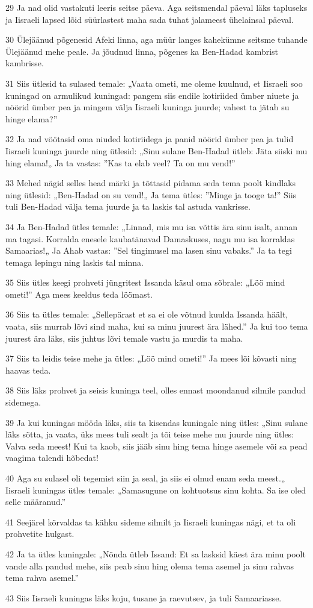 \par 29 Ja nad olid vastakuti leeris seitse päeva. Aga seitsmendal päeval läks tapluseks ja Iisraeli lapsed lõid süürlastest maha sada tuhat jalameest ühelainsal päeval.
\par 30 Ülejäänud põgenesid Afeki linna, aga müür langes kahekümne seitsme tuhande Ülejäänud mehe peale. Ja jõudnud linna, põgenes ka Ben-Hadad kambrist kambrisse.
\par 31 Siis ütlesid ta sulased temale: „Vaata ometi, me oleme kuulnud, et Iisraeli soo kuningad on armulikud kuningad: pangem siis endile kotiriided ümber niuete ja nöörid ümber pea ja mingem välja Iisraeli kuninga juurde; vahest ta jätab su hinge elama?”
\par 32 Ja nad vöötasid oma niuded kotiriidega ja panid nöörid ümber pea ja tulid Iisraeli kuninga juurde ning ütlesid: „Sinu sulane Ben-Hadad ütleb: Jäta siiski mu hing elama!„ Ja ta vastas: ”Kas ta elab veel? Ta on mu vend!”
\par 33 Mehed nägid selles head märki ja tõttasid pidama seda tema poolt kindlaks ning ütlesid: „Ben-Hadad on su vend!„ Ja tema ütles: ”Minge ja tooge ta!” Siis tuli Ben-Hadad välja tema juurde ja ta laskis tal astuda vankrisse.
\par 34 Ja Ben-Hadad ütles temale: „Linnad, mis mu isa võttis ära sinu isalt, annan ma tagasi. Korralda enesele kaubatänavad Damaskuses, nagu mu isa korraldas Samaarias!„ Ja Ahab vastas: ”Sel tingimusel ma lasen sinu vabaks.” Ja ta tegi temaga lepingu ning laskis tal minna.
\par 35 Siis ütles keegi prohveti jüngritest Issanda käsul oma sõbrale: „Löö mind ometi!” Aga mees keeldus teda löömast.
\par 36 Siis ta ütles temale: „Sellepärast et sa ei ole võtnud kuulda Issanda häält, vaata, siis murrab lõvi sind maha, kui sa minu juurest ära lähed.” Ja kui too tema juurest ära läks, siis juhtus lõvi temale vastu ja murdis ta maha.
\par 37 Siis ta leidis teise mehe ja ütles: „Löö mind ometi!” Ja mees lõi kõvasti ning haavas teda.
\par 38 Siis läks prohvet ja seisis kuninga teel, olles ennast moondanud silmile pandud sidemega.
\par 39 Ja kui kuningas mööda läks, siis ta kisendas kuningale ning ütles: „Sinu sulane läks sõtta, ja vaata, üks mees tuli sealt ja tõi teise mehe mu juurde ning ütles: Valva seda meest! Kui ta kaob, siis jääb sinu hing tema hinge asemele või sa pead vaagima talendi hõbedat!
\par 40 Aga su sulasel oli tegemist siin ja seal, ja siis ei olnud enam seda meest.„ Iisraeli kuningas ütles temale: „Samasugune on kohtuotsus sinu kohta. Sa ise oled selle määranud.”
\par 41 Seejärel kõrvaldas ta kähku sideme silmilt ja Iisraeli kuningas nägi, et ta oli prohvetite hulgast.
\par 42 Ja ta ütles kuningale: „Nõnda ütleb Issand: Et sa lasksid käest ära minu poolt vande alla pandud mehe, siis peab sinu hing olema tema asemel ja sinu rahvas tema rahva asemel.”
\par 43 Siis Iisraeli kuningas läks koju, tusane ja raevutsev, ja tuli Samaariasse.

